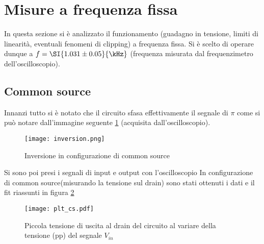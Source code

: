 \section{Misure a frequenza fissa}

In questa sezione si è analizzato il funzionamento (guadagno in tensione, limiti di linearità, eventuali fenomeni di clipping) a frequenza fissa. Si è scelto di operare dunque a $f=\SI{1.031\pm 0.05}{\kHz}$ (frequenza misurata dal frequenzimetro dell'oscilloscopio).\\

\subsection{Common source}
Innanzi tutto si è notato che il circuito sfasa effettivamente il segnale di $\pi$ come
si può notare dall'immagine seguente \ref{f:INV} (acquisita dall'oscilloscopio).

\begin{figure}[h]
	\centering
	\texttt{[image: inversion.png]}
	\caption{Inversione in configurazione di common source}
	\label{f:INV}
\end{figure}
Si sono poi presi i segnali di input e output con l'oscilloscopio
In configurazione di common source(misurando la tensione sul drain) sono stati ottenuti i dati e il fit riassunti in figura \ref{f:CS} 

\begin{figure}[h]
	\centering
	\texttt{[image: plt\_cs.pdf]}
	\caption{Piccola tensione di uscita al drain del circuito al variare della tensione (pp) del segnale $V_{in}$}
	\label{f:CS}
\end{figure}

